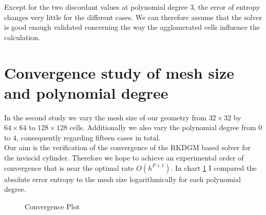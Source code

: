 	Except for the two discordant values at polynomial degree $3$, the error of entropy changes very little for the different cases. We can therefore assume that the solver is good enough validated concerning the way the agglomerated cells influence the calculation. 
	
	\section{Convergence study of mesh size and polynomial degree}
	
	In the second study we vary the mesh size of our geometry from $32 \times 32$ by $64 \times 64$ to $128 \times 128$ cells. Additionally we also vary the polynomial degree from $0$ to $4$, consequently regarding fifteen cases in total. \\
	Our aim is the verification of the convergence of the RKDGM based solver for the inviscid cylinder. Therefore we hope to achieve an experimental order of convergence that is near the optimal rate $O(h^{P+1})$. In chart \ref{mesherror} I compared the absolute error entropy to the mesh size logarithmically for each polynomial degree. 	
	\begin{figure}[htp]
		\centering		
		\caption{Convergence Plot}
		\label{mesherror}
	\end{figure}

